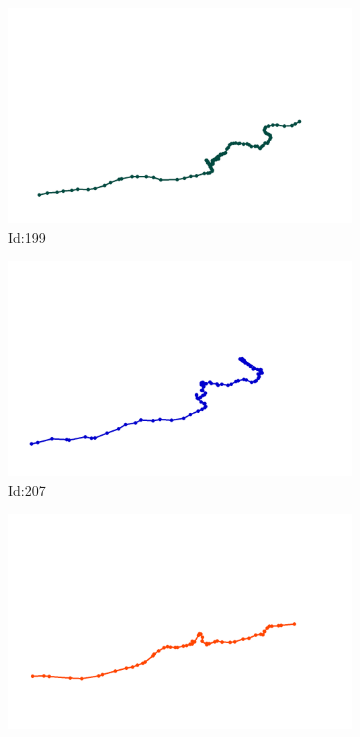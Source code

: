 \documentclass[12pt,twoside]{report}
\begin{document}
\begin{figure}
\centering
\begin{subfigure}[b]{0.20\textwidth}
\centering
\includegraphics[width=\textwidth]{../../trajectories/199.png}
\caption{Id:199}
\end{subfigure}
\begin{subfigure}[b]{0.20\textwidth}
\centering
\includegraphics[width=\textwidth]{../../trajectories/207.png}
\caption{Id:207}
\end{subfigure}
\begin{subfigure}[b]{0.20\textwidth}
\centering
\includegraphics[width=\textwidth]{../../trajectories/251.png}

\end{subfigure}
\end{figure}
\end{document}
